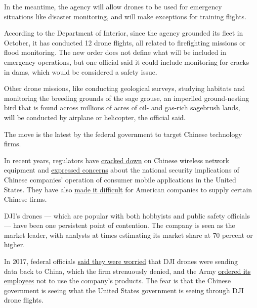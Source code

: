 In the meantime, the agency will allow drones to be used for emergency
situations like disaster monitoring, and will make exceptions for
training flights.

According to the Department of Interior, since the agency grounded its
fleet in October, it has conducted 12 drone flights, all related to
firefighting missions or flood monitoring. The new order does not define
what will be included in emergency operations, but one official said it
could include monitoring for cracks in dams, which would be considered a
safety issue.

Other drone missions, like conducting geological surveys, studying
habitats and monitoring the breeding grounds of the sage grouse, an
imperiled ground-nesting bird that is found across millions of acres of
oil- and gas-rich sagebrush lands, will be conducted by airplane or
helicopter, the official said.

The move is the latest by the federal government to target Chinese
technology firms.

In recent years, regulators have
\href{https://www.nytimes3xbfgragh.onion/2019/11/22/technology/huawei-funds-cut-fcc.html}{cracked
down} on Chinese wireless network equipment and
\href{https://www.nytimes3xbfgragh.onion/2019/03/28/us/politics/grindr-china-national-security.html}{expressed
concerns} about the national security implications of Chinese companies'
operation of consumer mobile applications in the United States. They
have also
\href{https://www.nytimes3xbfgragh.onion/2019/06/21/us/politics/us-china-trade-blacklist.html}{made
it difficult} for American companies to supply certain Chinese firms.

DJI's drones --- which are popular with both hobbyists and public safety
officials --- have been one persistent point of contention. The company
is seen as the market leader, with analysts at times estimating its
market share at 70 percent or higher.

In 2017, federal officials
\href{https://www.nytimes3xbfgragh.onion/2017/11/29/technology/dji-china-data-drones.html}{said
they were worried} that DJI drones were sending data back to China,
which the firm strenuously denied, and the Army
\href{https://www.defenseone.com/technology/2017/08/us-army-just-ordered-soldiers-stop-using-drones-chinas-dji/139999/?oref=defense_one_breaking_nl}{ordered
its employees} not to use the company's products. The fear is that the
Chinese government is seeing what the United States government is seeing
through DJI drone flights.

